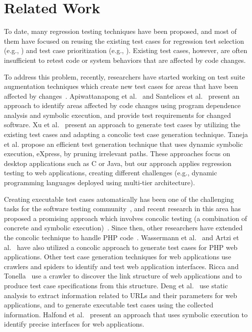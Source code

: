 \section{Related Work}
\label{sec:related-work}

To date, many regression testing techniques have been proposed,
and most of them have focused on reusing the existing test cases 
for regression test selection (e.g., \cite{rothermel97apr, yoo07})
and test case prioritization (e.g., \cite{elbaum02feb, walcott06}).
Existing test cases, however, are often insufficient to retest code 
or system behaviors that are affected by code changes.

To address this problem, recently, 
researchers have started working on test suite augmentation
techniques which create new test cases for areas that have been
affected by changes~\cite{apiwattanapong06, santelices11, xu10, 
xu11, taneja11, chen07}. Apiwattanapong et al.~\cite{apiwattanapong06} 
and Santelices et al.~\cite{santelices11} present an approach to 
identify areas affected by code changes using program dependence 
analysis and symbolic execution, and provide test requirements 
for changed software. Xu et al.~\cite{xu10, xu11} present an approach 
to generate test cases by utilizing the existing test cases and 
adapting a concolic test case generation technique. 
Taneja et al. \cite{taneja11} propose an efficient test
generation technique that uses dynamic symbolic execution, eXpress, 
by pruning irrelevant paths. These approaches focus on desktop
applications such as C or Java, but our approach applies regression
testing to web applications, creating different challenges
(e.g., dynamic programming languages deployed using multi-tier architecture).

Creating executable test cases automatically has been one of 
the challenging tasks for the software testing community~\cite{demillo91}, 
and recent research in this area has proposed a promising approach which 
involves concolic testing (a combination of concrete and symbolic 
execution)~\cite{sen05}. Since then, other researchers have extended 
the concolic technique to handle PHP code~\cite{wassermann08jul, artzi10}.
Wassermann et al.~\cite{ wassermann08jul} and Artzi et al.~\cite{artzi10} 
have also utilized a concolic approach to generate test cases for PHP 
web applications. Other test case generation techniques for web applications 
use crawlers and spiders to identify  and test web application interfaces. 
Ricca and Tonella~\cite{ricca01} use a crawler to discover the link structure
of web applications and to produce test case specifications from this
structure. Deng et al.~\cite{deng04} use static analysis
to extract information related to URLs and their parameters for
web applications, and to generate executable test cases using the
collected information. Halfond et al.~\cite{halfond09} present an
approach that uses symbolic execution to identify precise interfaces
for web applications. 

